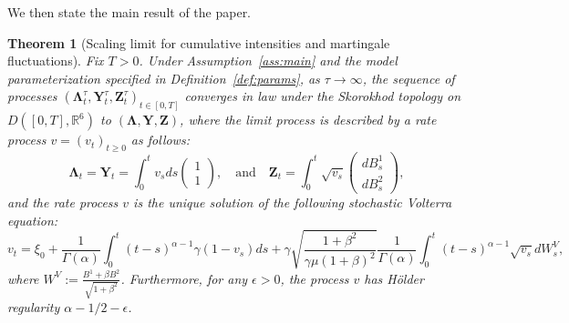 \documentclass[letterpaper]{article}
\numberwithin{equation}{section}
\newtheorem{theorem}{Theorem}[section]
\theoremstyle{definition}
\theoremstyle{remark}
\begin{document}
We then state the main result of the paper. 

\begin{theorem}[Scaling limit for cumulative intensities and martingale fluctuations]\label{theorem1}
  Fix $T>0$. Under Assumption~\ref{ass:main} and the model parameterization specified in Definition~\ref{def:params}, as $\tau\rightarrow \infty$, the sequence of processes $(\boldsymbol\Lambda_t^{\tau},\mathbf Y_t^{\tau},\mathbf Z_t^{\tau})_{t\in[0,T]}$ converges in law under the Skorokhod topology on $D([0,T],\mathbb{R}^6)$ to $(\boldsymbol\Lambda,\mathbf Y,\mathbf Z)$, where the limit process is described by a rate process $v = (v_t)_{t\ge 0}$ as follows:
  \[
    \boldsymbol\Lambda_t=\mathbf Y_t=\int_0^t v_s ds\left(  \begin{matrix}
     1\\1
    \end{matrix}\right), \quad \text{and} \quad \mathbf Z_t=\int_0^t\sqrt{v_s}\left(\begin{matrix}
    dB_s^1\\dB_s^2
    \end{matrix}\right),
  \]
  and the rate process $v$ is the unique solution of the following stochastic Volterra equation:
  \begin{equation}\label{eq:vt}
    v_t=\xi_0+\frac1{\Gamma(\alpha)}\int_0^t(t-s)^{\alpha-1}\gamma(1-v_s)ds+\gamma \sqrt{\frac{1+\beta^2}{\gamma \mu(1+\beta)^2}}\frac1{\Gamma(\alpha)}\int_0^t(t-s)^{\alpha-1}\sqrt{v_s}dW_s^V,
  \end{equation}
  where $W^V:=\frac{B^1+\beta B^2}{\sqrt{1+\beta^2}}$. Furthermore, for any $\epsilon>0$, the process $v$ has H\"older regularity $\alpha-1/2-\epsilon$. 
\end{theorem}
\end{document}
